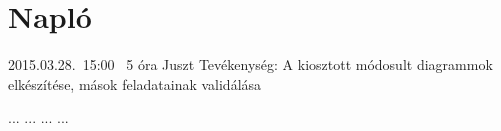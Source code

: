 %
\section{Napló}

\begin{naplo}


\bejegyzes
{2015.03.28.~15:00~}
{5 óra}
{Juszt}
{Tevékenység: A kiosztott módosult diagrammok elkészítése, mások feladatainak validálása}

\bejegyzes
{...}
{...}
{...}
{...}


\end{naplo}

